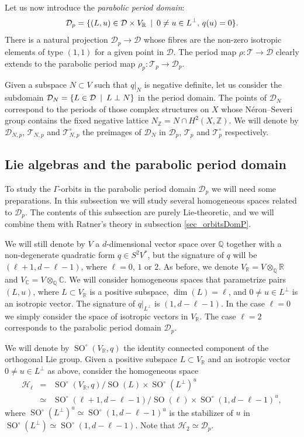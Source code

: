 \documentclass[11pt]{article}
\newcommand{\6}{\partial}
\newcommand{\bbZ}{\mathbb{Z}}
\newcommand{\bbQ}{\mathbb{Q}}
\newcommand{\bbR}{\mathbb{R}}
\newcommand{\bbC}{\mathbb{C}}
\newcommand{\DD}{\mathcal{D}}
\newcommand{\HH}{\mathcal{H}}
\newcommand{\SO}{\operatorname{SO}}
\newcommand{\st}{\enskip |\enskip}
\newcommand{\Teich}{\mathcal{T}}
\newcommand{\TeichP}{\Teich_p}
\newcommand{\Dom}{\mathcal{D}}
\newcommand{\DomP}{\Dom_p}
\newcommand{\Per}{\rho}
\newcommand{\PerP}{\Per_p}
\begin{document}
Let us now introduce the {\it parabolic period domain}:
$$
\DomP = \{ (L,u)\in \Dom\times V_\bbR \st 0\neq u\in L^\perp,\, q(u) = 0\}.
$$
There is a natural projection $\DomP\to \Dom$ whose fibres are the non-zero isotropic elements
of type $(1,1)$ for a given point in $\Dom$. The period map $\Per\colon \Teich\to\Dom$
clearly extends to the parabolic period map $\PerP\colon \TeichP\to \DomP$.

Given a subspace $N\subset V$ such that $q|_N$ is negative definite, let us consider
the subdomain $\DD_N = \{ L \in \DD\st L\perp N\}$ in the period domain. The points of $\DD_N$
correspond to the periods of those complex structures on $X$ whose N\'eron--Severi group contains
the fixed negative lattice $N_\bbZ=N\cap H^2(X,\bbZ)$. We will denote by $\DD_{N,p}$, $\Teich_{N,p}$
and $\Teich_{N,p}^\circ$ the preimages of $\DD_N$ in $\DD_p$, $\Teich_p$ and $\Teich_p^\circ$ respectively. 

\subsection{Lie algebras and the parabolic period domain}\label{sec_LieDomP}

To study the $\Gamma$-orbits in the parabolic period domain $\DomP$
we will need some preparations. In this subsection we will
study several homogeneous spaces related to $\DomP$.
The contents of this subsection are purely Lie-theoretic,
and we will combine them with Ratner's theory in subsection \ref{sec_orbitsDomP}.

We will still denote by $V$ a $d$-dimensional vector space over $\bbQ$
together with a non-degenerate quadratic form $q\in S^2V^*$,
but the signature of $q$ will be $(\ell+1,d-\ell-1)$, where $\ell = 0$, $1$ or $2$. 
As before, we denote $V_\bbR = V\otimes_\bbQ \bbR$ and $V_\bbC = V\otimes_\bbQ \bbC$.
We will consider homogeneous spaces that parametrize pairs $(L,u)$, where
$L\subset V_\bbR$ is a positive subspace, $\dim(L)=\ell$, and $0\neq u\in L^\perp$ is an isotropic vector.
The signature of $q|_{L^\perp}$ is $(1,d-\ell-1)$.
In the case $\ell = 0$ we simply consider the space of isotropic vectors in $V_\bbR$.
The case $\ell = 2$ corresponds to the parabolic period domain $\DomP$.

We will denote by $\SO^\circ(V_\bbR,q)$ the identity connected component of the orthogonal Lie group.
Given a positive subspace $L\subset V_\bbR$ and an isotropic vector $0\neq u\in L^\perp$ as above,
consider the homogeneous space
\begin{eqnarray*}
\HH_\ell &=& \SO^\circ(V_\bbR,q)/\SO(L)\times \SO^\circ(L^\perp)^u\\
 &\simeq& \SO^\circ(\ell+1,d-\ell-1)/\SO(\ell)\times \SO^\circ(1,d-\ell-1)^u,
\end{eqnarray*}
where $\SO^\circ(L^\perp)^u \simeq \SO^\circ(1,d-\ell-1)^u$ is the stabilizer of $u$ in $\SO^\circ(L^\perp)\simeq \SO^\circ(1,d-\ell-1)$.
Note that $\HH_2\simeq \DomP$.
\end{document}
